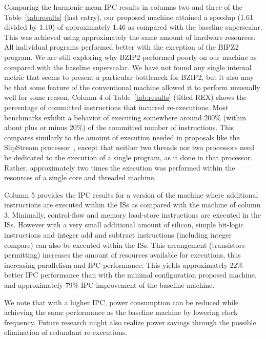 \documentclass[10pt,dvips]{article}
\begin{document}
%
Comparing the harmonic mean IPC results in columns two and three of the
Table~\ref{tab:results} (last entry), 
our proposed machine attained a speedup (1.61 divided by 1.10) 
of approximately
1.46 as compared with the baseline superscalar.
This was achieved using approximately the same amount of hardware resources.
All individual programs performed better with the exception of
the BIPZ2 program.
We are still exploring why BZIP2 performed poorly on our
machine as compared with the baseline superscalar.
We have not found any single internal metric that seems to
present a particular bottleneck for BZIP2, but it also may be that
some feature of the conventional machine allowed it to perform
unusually well for some reason.
Column 4 of Table~\ref{tab:results} (titled REX) shows the percentage
of committed instructions that incurred re-executions.
Most benchmarks exhibit a behavior of executing somewhere around
200\% (within about plus or minus 20\%) of the committed
number of instructions.
This compares similarly to the amount of execution needed
in proposals like the SlipStream processor~\cite{ibrahim03},
except that neither two threads nor two processors need be
dedicated to the execution of a single program, as it done in
that processor. 
Rather, approximately two times the execution was performed
within the resources of a single core and threaded machine.

Column 5 provides the IPC results for a version of the
machine where additional instructions are executed within
the ISs as compared with the machine of column 3.
Minimally, control-flow and memory load-store instructions
are executed in the ISs.  
However with a very small additional amount of silicon,
simple bit-logic instructions and integer add and subtract
instructions (including integer compare) can also 
be executed within the ISs.
This arrangement (transistors permitting) increases the
amount of resources available for executions, thus increasing
parallelism and IPC performance.
This yields approximately 22\% better IPC performance
than with the minimal configuration proposed machine, and approximately
79\% IPC improvement of the baseline machine.

We note that with a higher IPC, 
power consumption can be reduced while achieving the same
performance as the baseline machine by lowering clock frequency.
Future research might also realize power savings through the possible
elimination of redundant re-executions.
%
%
\vspace{-0.15in}
\end{document}
